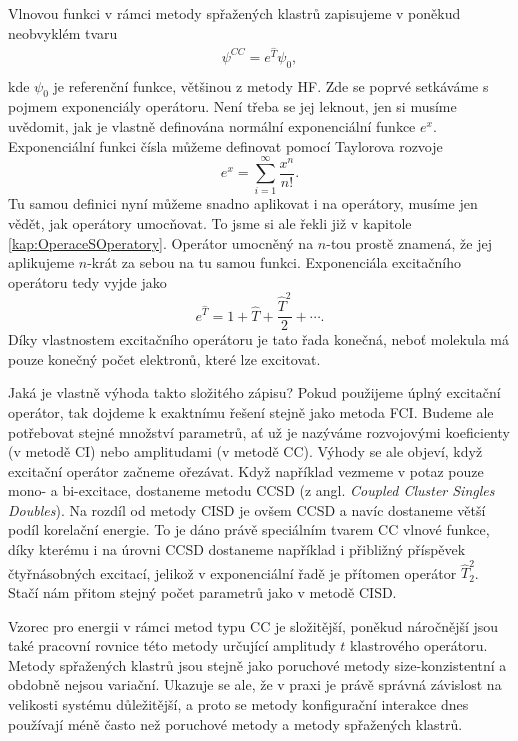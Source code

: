 Vlnovou funkci v rámci metody spřažených klastrů zapisujeme v poněkud neobvyklém tvaru
\begin{eqnarray}
\psi^{CC} = e^{\hat{T}} \psi_0 ,  \\
\end{eqnarray}
kde $\psi_0$ je referenční funkce, většinou z metody HF. Zde se poprvé setkáváme s pojmem exponenciály operátoru. Není třeba se jej leknout, jen si musíme uvědomit, jak je vlastně definována normální exponenciální funkce $e^x$. Exponenciální funkci čísla můžeme definovat pomocí Taylorova rozvoje
\begin{equation}
e^x=\sum_{i=1}^\infty \frac{x^n}{n!} .
\end{equation}
Tu samou definici nyní můžeme snadno aplikovat i na operátory, musíme jen vědět, jak operátory umocňovat.
To jsme si ale řekli již v kapitole \ref{kap:OperaceSOperatory}. Operátor umocněný na $n$-tou prostě znamená, že jej aplikujeme $n$-krát za sebou na tu samou funkci. Exponenciála excitačního operátoru tedy vyjde jako 
\begin{equation}
e^{\hat{T}} = 1+\hat{T}+\frac{\hat{T}^2}{2}+\cdots.
\end{equation}
Díky vlastnostem excitačního operátoru je tato řada konečná, neboť molekula má pouze konečný počet elektronů, které lze excitovat.

Jaká je vlastně výhoda takto složitého zápisu?
Pokud použijeme úplný excitační operátor, tak dojdeme k exaktnímu řešení stejně jako metoda FCI. Budeme ale potřebovat stejné množství parametrů, ať už je nazýváme rozvojovými koeficienty (v metodě CI) nebo amplitudami (v metodě CC).
Výhody se ale objeví, když excitační operátor začneme ořezávat. Když například vezmeme v potaz pouze mono- a bi-excitace, dostaneme metodu CCSD  (z angl. \textit{Coupled Cluster Singles Doubles}).
Na rozdíl od metody CISD je ovšem CCSD  a navíc dostaneme větší podíl korelační energie.
To je dáno právě speciálním tvarem CC vlnové funkce, díky kterému i na úrovni CCSD dostaneme například i přibližný příspěvek čtyřnásobných excitací, jelikož v exponenciální řadě je přítomen operátor $\hat{T}_2^2$. Stačí nám přitom stejný počet parametrů jako v metodě CISD.

Vzorec pro energii v rámci metod typu CC je složitější, poněkud náročnější jsou také pracovní rovnice této metody určující amplitudy $t$ klastrového operátoru. Metody spřažených klastrů jsou stejně jako poruchové metody size-konzistentní a obdobně nejsou variační. Ukazuje se ale, že v praxi je právě správná závislost na velikosti systému důležitější, a proto se metody konfigurační interakce dnes používají méně často než poruchové metody a metody spřažených klastrů.

